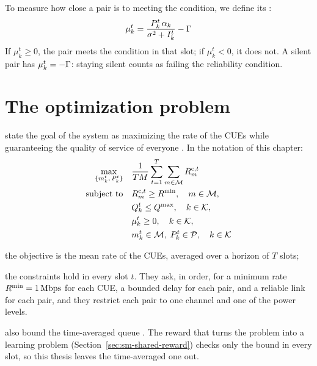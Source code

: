 To measure how close a pair is to meeting the condition, we define its :
\begin{equation}
  \mu_k^t = \frac{P_k^t\, \alpha_k}{\sigma^2 + I_k^t} - \Gamma
  \label{eq:sm-margin}
\end{equation}
If $\mu_k^t \ge 0$, the pair meets the condition in that slot; if $\mu_k^t < 0$, it does not. A silent pair
has $\mu_k^t = -\Gamma$: staying silent counts as failing the reliability condition.

\section{The optimization problem}
\label{sec:sm-problem}

\citet{li+22fedmarl} state the goal of the system as maximizing the rate of the \acp{CUE} while guaranteeing
the quality of service of everyone \cite[Eq.~19]{li+22fedmarl}. In the notation of this chapter:
\begin{equation}
  \begin{aligned}
    \max_{\{m_k^t,\, P_k^t\}} \quad & \frac{1}{TM} \sum_{t=1}^{T} \sum_{m \in \mathcal{M}} R_m^{\mathrm{c},t} \\
    \text{subject to} \quad & R_m^{\mathrm{c},t} \ge R^{\mathrm{min}}, \quad m \in \mathcal{M}, \\
      & Q_k^t \le Q^{\mathrm{max}}, \quad k \in \mathcal{K}, \\
      & \mu_k^t \ge 0, \quad k \in \mathcal{K}, \\
      & m_k^t \in \mathcal{M},\; P_k^t \in \mathcal{P}, \quad k \in \mathcal{K}
  \end{aligned}
  \label{eq:sm-problem}
\end{equation}
\begin{wherelist}
  \item the objective is the mean rate of the \acp{CUE}, averaged over a horizon of $T$ slots;
  \item the constraints hold in every slot $t$. They ask, in order, for a minimum rate
    $R^{\mathrm{min}} = \SI{1}{Mbps}$ for each \ac{CUE}, a bounded delay for each pair, and a reliable link for each
    pair, and they restrict each pair to one channel and one of the power levels.
\end{wherelist}
\citet{li+22fedmarl} also bound the time-averaged queue \cite[Eq.~18]{li+22fedmarl}. The reward that turns
the problem into a learning problem (Section~\ref{sec:sm-shared-reward}) checks only the bound in every
slot, so this thesis leaves the time-averaged one out.

